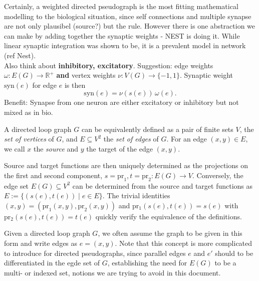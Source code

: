 \begin{remark} 



  Certainly, a weighted directed pseudograph is the most fitting
  mathematical modelling to the biological situation, since self
  connections and multiple synapse are not only plausibel (source?)
  but the rule. However there is one abstraction we can make by adding
  together the synaptic weights - NEST is doing it. While linear
  synaptic integration was shown to be, it is a prevalent model in
  network (ref Nest).\\ 

  Also think about \textbf{inhibitory, excitatory}. Suggestion: edge
  weights $\omega: E(G) \to \mathbb{R}^{+}$ \textbf{and} vertex
  weights $\nu: V(G) \to \{-1, 1\}$. Synaptic weight $\mathrm{syn}(e)$
  for edge $e$ is then \[\mathrm{syn}(e) = \nu(s(e))\,\omega(e).\]
  Benefit: Synapse from one neuron are either excitatory or inhibitory
  but not mixed as in bio.
\end{remark}


\begin{remark}

  A directed loop graph $G$ can be equivalently defined as a pair of
  finite sets $V$, the \textit{set of vertices} of
  $G$, and $E \subseteq V^2$ the \textit{set of edges} of $G$. For an
  edge $(x,y) \in E$, we call $x$ the \textit{source} and $y$ the
  target of the edge $(x,y)$.

  Source and target functions are then uniquely determined as the
  projections on the first and second component, $s = \mathrm{pr}_1, t
  = \mathrm{pr}_2: E(G) \to V.$ Conversely, the edge set $E(G)
  \subseteq V^2$ can be determined from the source and target
  functions as $E:=\{(s(e),t(e)) \mid e \in E\}$. The trivial identities
  $(x,y) = (\mathrm{pr}_1(x,y),\mathrm{pr}_2(x,y))$ and
  $\mathrm{pr_1}(s(e), t(e)) = s(e)$ with $\mathrm{pr_2}(s(e), t(e)) =
  t(e)$ quickly verify the equivalence of the definitions.

  Given a directed loop graph $G$, we often assume the graph to be
  given in this form and write edges as $e=(x,y)$. Note that this
  concept is more complicated to introduce for directed pseudographs,
  since parallel edges $e$ and $e'$ should to be differentiated in the
  egde set of $G$, establishing the need for $E(G)$ to be a multi- or
  indexed set, notions we are trying to avoid in this document.

\end{remark}



